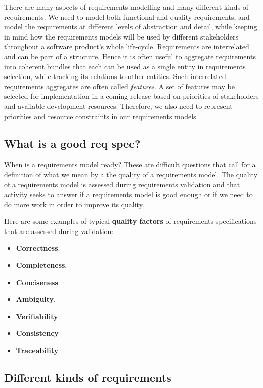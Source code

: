 There are many aspects of requirements modelling and many different kinds of requirements. We need to model both functional and quality requirements, and model the requirements at different levels of abstraction and detail, while keeping in mind how the requirements models will be used by different stakeholders throughout a software product's whole life-cycle. Requirements are interrelated and can be part of a structure. Hence it is often useful to aggregate requirements into coherent bundles that each can be used as a single entity in requirements selection, while tracking its relations to other entities. Such interrelated requirements aggregates are often called \emph{features}. A set of features may be selected for implementation in a coming release based on priorities of stakeholders and available development resources. Therefore, we also need to represent priorities and resource constraints in our requirements models.


\subsection{What is a good req spec?}

 When is a requirements model ready? These are difficult questions that call for a definition of what we mean by a the quality of a requirements model. The quality of a requirements model is assessed during requirements validation and that activity seeks to answer if a requirements model is good enough or if we need to do more work in order to improve its quality.

Here are some examples of typical \textbf{quality factors} of requirements specifications that are assessed during validation:
\begin{itemize}
  \item \textbf{Correctness}. 
  \item \textbf{Completeness}.
  \item \textbf{Conciseness}
  \item \textbf{Ambiguity}.
  \item \textbf{Verifiability}.
  \item \textbf{Consistency}
  \item \textbf{Traceability}
\end{itemize}



\subsection{Different kinds of requirements}

